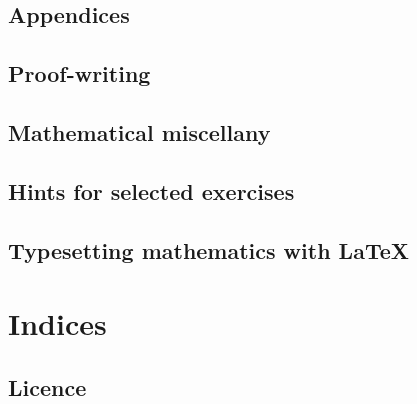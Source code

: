 \documentclass[10pt]{book}
\begin{document}
\appendix
\begin{appendices}
\renewcommand{\sectionmark}[1]{\markboth{\leftmark}{Section \thesection.\ #1}}
\renewcommand{\chaptermark}[1]{\markboth{Appendix \thechapter.\ #1}{\rightmark}}

\part*{Appendices}

\chapter{Proof-writing}
    \label{apxWriting}
    \renewcommand\chaptername{Proof-writing}
    

\chapter{Mathematical miscellany}    
    \label{apxMiscellany}
    \renewcommand\chaptername{Mathematical miscellany}
    

\chapter{Hints for selected exercises}
    \label{apxHints}
    \renewcommand\chaptername{Hints to selected exercises}
    

\chapter{Typesetting mathematics with \LaTeX{}}
    \label{apxLaTeX}
    \renewcommand\chaptername{Typesetting mathematics with \LaTeX{}}
    

\end{appendices}

\backmatter

{%
\part*{Indices}

\renewcommand{\chaptername}{Indices}
\newpage
{}
\printindex

\printindex[vocabulary]

\printindex[notation]

\printindex[latex]%
}

\clearpage\newpage\clearpage
\chapter*{Licence}
    \renewcommand{\chaptermark}[1]{\markboth{Licence}{Licence}}
    \renewcommand{\sectionmark}[1]{\markboth{Licence}{Licence}}
    \renewcommand\chaptername{Licence}
    
\end{document}
